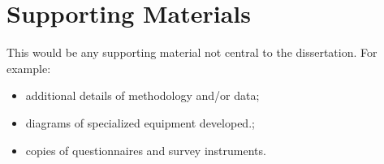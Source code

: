 \chapter{Supporting Materials}

This would be any supporting material not central to the dissertation.
For example:
\begin{itemize}
\item additional details of methodology and/or data;
\item diagrams of specialized equipment developed.;
\item copies of questionnaires and survey instruments.
\end{itemize}

\clearpage
